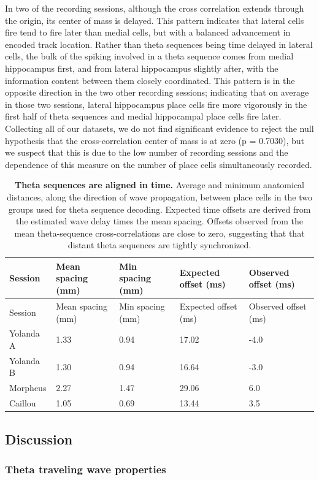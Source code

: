 \documentclass[]{article}
\begin{document}
In two of the recording sessions, although the cross correlation extends
through the origin, its center of mass is delayed. This pattern
indicates that lateral cells fire tend to fire later than medial cells,
but with a balanced advancement in encoded track location. Rather than
theta sequences being time delayed in lateral cells, the bulk of the
spiking involved in a theta sequence comes from medial hippocampus
first, and from lateral hippocampus slightly after, with the information
content between them closely coordinated. This pattern is in the
opposite direction in the two other recording sessions; indicating that
on average in those two sessions, lateral hippocampus place cells fire
more vigorously in the first half of theta sequences and medial
hippocampal place cells fire later. Collecting all of our datasets, we
do not find significant evidence to reject the null hypothesis that the
cross-correlation center of mass is at zero (p = 0.7030), but we suspect
that this is due to the low number of recording sessions and the
dependence of this measure on the number of place cells simultaneously
recorded.

\begin{longtable}[c]{@{}lllll@{}}
\caption{\textbf{Theta sequences are aligned in time.} Average and
minimum anatomical distances, along the direction of wave propagation,
between place cells in the two groups used for theta sequence decoding.
Expected time offsets are derived from the estimated wave delay times
the mean spacing. Offsets observed from the mean theta-sequence
cross-correlations are close to zero, suggesting that that distant theta
sequences are tightly synchronized.}\tabularnewline
\toprule
Session & Mean spacing (mm) & Min spacing (mm) & Expected offset (ms) &
Observed offset (ms)\tabularnewline
\midrule
\endfirsthead
\toprule
Session & Mean spacing (mm) & Min spacing (mm) & Expected offset (ms) &
Observed offset (ms)\tabularnewline
\midrule
\endhead
Yolanda A & 1.33 & 0.94 & 17.02 & -4.0\tabularnewline
Yolanda B & 1.30 & 0.94 & 16.64 & -3.0\tabularnewline
Morpheus & 2.27 & 1.47 & 29.06 & 6.0\tabularnewline
Caillou & 1.05 & 0.69 & 13.44 & 3.5\tabularnewline
\bottomrule
\end{longtable}

\subsection{Discussion}

\subsubsection{Theta traveling wave properties}
\end{document}
